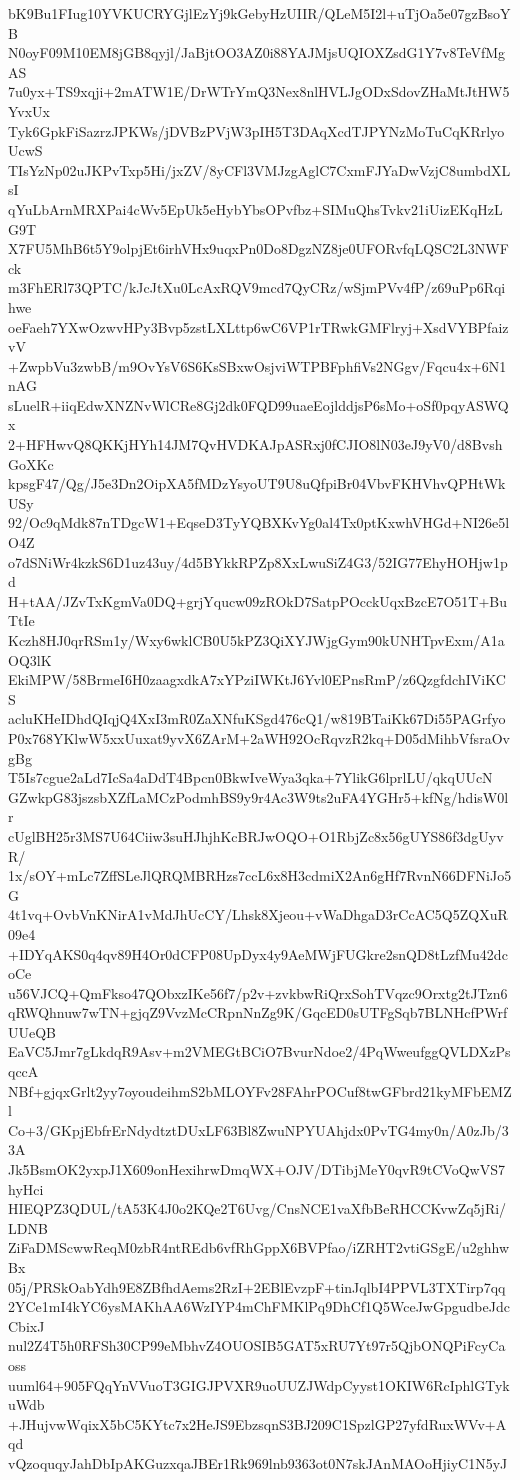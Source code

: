 bK9Bu1FIug10YVKUCRYGjlEzYj9kGebyHzUIIR/QLeM5I2l+uTjOa5e07gzBsoYB
N0oyF09M10EM8jGB8qyjl/JaBjtOO3AZ0i88YAJMjsUQIOXZsdG1Y7v8TeVfMgAS
7u0yx+TS9xqji+2mATW1E/DrWTrYmQ3Nex8nlHVLJgODxSdovZHaMtJtHW5YvxUx
Tyk6GpkFiSazrzJPKWs/jDVBzPVjW3pIH5T3DAqXcdTJPYNzMoTuCqKRrlyoUcwS
TIsYzNp02uJKPvTxp5Hi/jxZV/8yCFl3VMJzgAglC7CxmFJYaDwVzjC8umbdXLsI
qYuLbArnMRXPai4cWv5EpUk5eHybYbsOPvfbz+SIMuQhsTvkv21iUizEKqHzLG9T
X7FU5MhB6t5Y9olpjEt6irhVHx9uqxPn0Do8DgzNZ8je0UFORvfqLQSC2L3NWFck
m3FhERl73QPTC/kJcJtXu0LcAxRQV9mcd7QyCRz/wSjmPVv4fP/z69uPp6Rqihwe
oeFaeh7YXwOzwvHPy3Bvp5zstLXLttp6wC6VP1rTRwkGMFlryj+XsdVYBPfaizvV
+ZwpbVu3zwbB/m9OvYsV6S6KsSBxwOsjviWTPBFphfiVs2NGgv/Fqcu4x+6N1nAG
sLuelR+iiqEdwXNZNvWlCRe8Gj2dk0FQD99uaeEojlddjsP6sMo+oSf0pqyASWQx
2+HFHwvQ8QKKjHYh14JM7QvHVDKAJpASRxj0fCJIO8lN03eJ9yV0/d8BvshGoXKc
kpsgF47/Qg/J5e3Dn2OipXA5fMDzYsyoUT9U8uQfpiBr04VbvFKHVhvQPHtWkUSy
92/Oc9qMdk87nTDgcW1+EqseD3TyYQBXKvYg0al4Tx0ptKxwhVHGd+NI26e5lO4Z
o7dSNiWr4kzkS6D1uz43uy/4d5BYkkRPZp8XxLwuSiZ4G3/52IG77EhyHOHjw1pd
H+tAA/JZvTxKgmVa0DQ+grjYqucw09zROkD7SatpPOcckUqxBzcE7O51T+BuTtIe
Kczh8HJ0qrRSm1y/Wxy6wklCB0U5kPZ3QiXYJWjgGym90kUNHTpvExm/A1aOQ3lK
EkiMPW/58BrmeI6H0zaagxdkA7xYPziIWKtJ6Yvl0EPnsRmP/z6QzgfdchIViKCS
acluKHeIDhdQIqjQ4XxI3mR0ZaXNfuKSgd476cQ1/w819BTaiKk67Di55PAGrfyo
P0x768YKlwW5xxUuxat9yvX6ZArM+2aWH92OcRqvzR2kq+D05dMihbVfsraOvgBg
T5Is7cgue2aLd7IcSa4aDdT4Bpcn0BkwIveWya3qka+7YlikG6lprlLU/qkqUUcN
GZwkpG83jszsbXZfLaMCzPodmhBS9y9r4Ac3W9ts2uFA4YGHr5+kfNg/hdisW0lr
cUglBH25r3MS7U64Ciiw3suHJhjhKcBRJwOQO+O1RbjZc8x56gUYS86f3dgUyvR/
1x/sOY+mLc7ZffSLeJlQRQMBRHzs7ccL6x8H3cdmiX2An6gHf7RvnN66DFNiJo5G
4t1vq+OvbVnKNirA1vMdJhUcCY/Lhsk8Xjeou+vWaDhgaD3rCcAC5Q5ZQXuR09e4
+IDYqAKS0q4qv89H4Or0dCFP08UpDyx4y9AeMWjFUGkre2snQD8tLzfMu42dcoCe
u56VJCQ+QmFkso47QObxzIKe56f7/p2v+zvkbwRiQrxSohTVqzc9Orxtg2tJTzn6
qRWQhnuw7wTN+gjqZ9VvzMcCRpnNnZg9K/GqcED0sUTFgSqb7BLNHcfPWrfUUeQB
EaVC5Jmr7gLkdqR9Asv+m2VMEGtBCiO7BvurNdoe2/4PqWweufggQVLDXzPsqccA
NBf+gjqxGrlt2yy7oyoudeihmS2bMLOYFv28FAhrPOCuf8twGFbrd21kyMFbEMZl
Co+3/GKpjEbfrErNdydtztDUxLF63Bl8ZwuNPYUAhjdx0PvTG4my0n/A0zJb/33A
Jk5BsmOK2yxpJ1X609onHexihrwDmqWX+OJV/DTibjMeY0qvR9tCVoQwVS7hyHci
HIEQPZ3QDUL/tA53K4J0o2KQe2T6Uvg/CnsNCE1vaXfbBeRHCCKvwZq5jRi/LDNB
ZiFaDMScwwReqM0zbR4ntREdb6vfRhGppX6BVPfao/iZRHT2vtiGSgE/u2ghhwBx
05j/PRSkOabYdh9E8ZBfhdAems2RzI+2EBlEvzpF+tinJqlbI4PPVL3TXTirp7qq
2YCe1mI4kYC6ysMAKhAA6WzIYP4mChFMKlPq9DhCf1Q5WceJwGpgudbeJdcCbixJ
nul2Z4T5h0RFSh30CP99eMbhvZ4OUOSIB5GAT5xRU7Yt97r5QjbONQPiFcyCaoss
uuml64+905FQqYnVVuoT3GIGJPVXR9uoUUZJWdpCyyst1OKIW6RcIphlGTykuWdb
+JHujvwWqixX5bC5KYtc7x2HeJS9EbzsqnS3BJ209C1SpzlGP27yfdRuxWVv+Aqd
vQzoquqyJahDbIpAKGuzxqaJBEr1Rk969lnb9363ot0N7skJAnMAOoHjiyC1N5yJ
